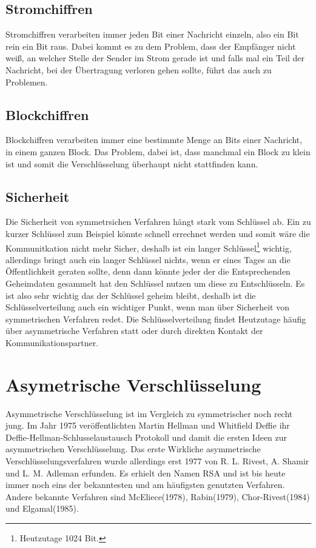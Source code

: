 \documentclass[a4paper,12pt,titlepage]{article}
\begin{document}
\subsection{Stromchiffren}
Stromchiffren verarbeiten immer jeden Bit einer Nachricht einzeln, also ein Bit rein ein Bit raus. Dabei kommt es zu dem Problem, dass der Empfänger nicht weiß, an welcher Stelle der Sender im Strom gerade ist und falls mal ein Teil der Nachricht, bei der Übertragung verloren gehen sollte, führt das auch zu Problemen.
\subsection{Blockchiffren}
Blockchiffren verarbeiten immer eine bestimmte Menge an Bits einer Nachricht, in einem ganzen Block. Das Problem, dabei ist, dass manchmal ein Block zu klein ist und somit die Verschlüsselung überhaupt nicht stattfinden kann.

\subsection{Sicherheit}\label{symm:secu}
Die Sicherheit von symmetrsichen Verfahren hängt stark vom Schlüssel ab. Ein zu kurzer Schlüssel zum Beispiel könnte schnell errechnet werden und somit wäre die Kommunitkation nicht mehr Sicher, deshalb ist ein langer Schlüssel\footnote{Heutzutage 1024 Bit.} wichtig, allerdings bringt auch ein langer Schlüssel nichts, wenn er eines Tages an die Öffentlichkeit geraten sollte, denn dann könnte jeder der die Entsprechenden Geheimdaten gesammelt hat den Schlüssel nutzen um diese zu Entschlüsseln. Es ist also sehr wichtig das der Schlüssel geheim bleibt, deshalb ist die Schlüsselverteilung auch ein wichtiger Punkt, wenn man über Sicherheit von symmetrischen Verfahren redet. Die Schlüsselverteilung findet Heutzutage häufig über asymmetrische Verfahren statt oder durch direkten Kontakt der Kommunikationspartner.

\section{Asymetrische Verschlüsselung}\label{asymm}
Asymmetrische Verschlüsselung ist im Vergleich zu symmetrischer noch recht jung. Im Jahr 1975 veröffentlichten Martin Hellman und Whitfield Deffie ihr Deffie-Hellman-Schlusselaustausch Protokoll und damit die ersten Ideen zur asymmetrischen Verschlüsselung. Das erste Wirkliche asymmetrische Verschlüsselungsverfahren wurde allerdings erst 1977 von R. L. Rivest, A. Shamir und L. M. Adleman erfunden. Es erhielt den Namen RSA und ist bis heute immer noch eins der bekanntesten und am häufigsten genutzten Verfahren. Andere bekannte Verfahren sind McEliece(1978), Rabin(1979), Chor-Rivest(1984) und Elgamal(1985).
\end{document}

